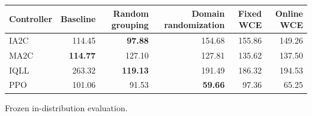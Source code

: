 \begin{tabular}{lrrrrr}
\hline
Controller & Baseline & Random grouping & Domain randomization & Fixed WCE & Online WCE \\
\hline
IA2C & 114.45 & \textbf{97.88} & 154.68 & 155.86 & 149.26 \\
MA2C & \textbf{114.77} & 127.10 & 127.81 & 135.62 & 137.50 \\
IQLL & 263.32 & \textbf{119.13} & 191.49 & 186.32 & 194.53 \\
PPO & 101.06 & 91.53 & \textbf{59.66} & 97.36 & 65.25 \\
\hline
\end{tabular}
Frozen in-distribution evaluation.
